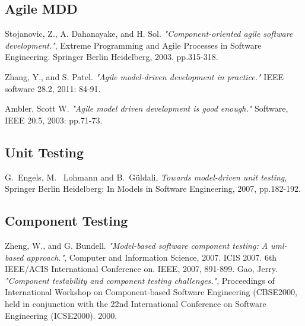 \documentclass[ProjectPlan_innit.tex]{subfiles}
\begin{document}
\begin{thebibliography}{1}
\subsection{Agile MDD}
\bibitem{}
Stojanovic, Z., A. Dahanayake, and H. Sol. \emph{"Component-oriented agile software development."}, Extreme Programming and Agile Processes in Software Engineering. Springer Berlin Heidelberg, 2003. pp.315-318.

\bibitem{}
Zhang, Y., and S. Patel. \emph{"Agile model-driven development in practice."} IEEE software 28.2, 2011: 84-91.

\bibitem{}
Ambler, Scott W. \emph{"Agile model driven development is good enough."} Software, IEEE 20.5, 2003: pp.71-73.



\subsection{Unit Testing}
\bibitem{} 
G.~Engels, M. ~Lohmann and B.~Güldali, \emph{Towards model-driven unit testing}, Springer Berlin Heidelberg: In Models in Software Engineering, 2007, pp.182-192.

\subsection{Component Testing}
\bibitem{}
Zheng, W., and G. Bundell. \emph{"Model-based software component testing: A uml-based approach."}, Computer and Information Science, 2007. ICIS 2007. 6th IEEE/ACIS International Conference on. IEEE, 2007, 891-899.
\bibitem{}
Gao, Jerry. \emph{"Component testability and component testing challenges."}, Proceedings of International Workshop on Component-based Software Engineering (CBSE2000, held in conjunction with the 22nd International Conference on Software Engineering (ICSE2000). 2000.


\end{thebibliography}
\end{document}
